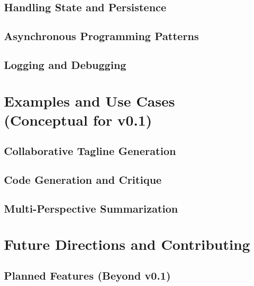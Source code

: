 \documentclass{amsbook}
\theoremstyle{definition}
\theoremstyle{remark}
\numberwithin{equation}{chapter} %
\begin{document}
    \section{Handling State and Persistence}
    \section{Asynchronous Programming Patterns}
    \section{Logging and Debugging}

\chapter{Examples and Use Cases (Conceptual for v0.1)}
    \section{Collaborative Tagline Generation}
    \section{Code Generation and Critique}
    \section{Multi-Perspective Summarization}

\chapter{Future Directions and Contributing}
    \section{Planned Features (Beyond v0.1)}
\end{document}
